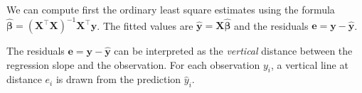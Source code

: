 \documentclass[]{book}
\newenvironment{Shaded}{\begin{snugshade}}{\end{snugshade}}
\newcommand{\CommentTok}[1]{\textcolor[rgb]{0.56,0.35,0.01}{\textit{#1}}}
\newcommand{\DataTypeTok}[1]{\textcolor[rgb]{0.13,0.29,0.53}{#1}}
\newcommand{\DecValTok}[1]{\textcolor[rgb]{0.00,0.00,0.81}{#1}}
\newcommand{\KeywordTok}[1]{\textcolor[rgb]{0.13,0.29,0.53}{\textbf{#1}}}
\newcommand{\NormalTok}[1]{#1}
\newcommand{\OperatorTok}[1]{\textcolor[rgb]{0.81,0.36,0.00}{\textbf{#1}}}
\newcommand{\StringTok}[1]{\textcolor[rgb]{0.31,0.60,0.02}{#1}}
\theoremstyle{definition}
\theoremstyle{definition}
\theoremstyle{definition}
\theoremstyle{remark}
\begin{document}
We can compute first the ordinary least square estimates using the formula \(\hat{\boldsymbol{\beta}} = (\mathbf{X}^\top\mathbf{X})^{-1}\mathbf{X}^\top\boldsymbol{y}\). The fitted values are \(\hat{\boldsymbol{y}} = \mathbf{X}\hat{\boldsymbol{\beta}}\) and the residuals \(\boldsymbol{e} = \boldsymbol{y} - \hat{\boldsymbol{y}}\).

\begin{Shaded}
\end{Shaded}

The residuals \(\boldsymbol{e} = \boldsymbol{y} -\hat{\boldsymbol{y}}\) can be interpreted as the \emph{vertical} distance between the regression slope and the observation. For each observation \(y_i\), a vertical line at distance \(e_i\) is drawn from the prediction \(\hat{y}_i\).
\end{document}
